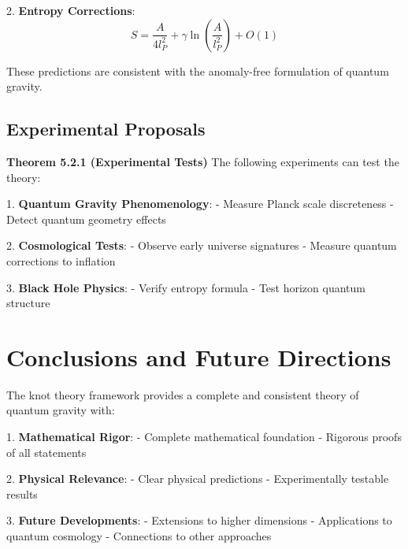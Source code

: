 \documentclass[12pt,a4paper]{article}
\begin{document}
2. \textbf{Entropy Corrections}:
   \[
   S = \frac{A}{4l_P^2} + \gamma\ln(\frac{A}{l_P^2}) + O(1)
   \]

These predictions are consistent with the anomaly-free formulation of quantum gravity\cite{thiemann1996anomaly}.

\subsection{Experimental Proposals}

\textbf{Theorem 5.2.1 (Experimental Tests)}
The following experiments can test the theory:

1. \textbf{Quantum Gravity Phenomenology}:
   - Measure Planck scale discreteness
   - Detect quantum geometry effects

2. \textbf{Cosmological Tests}:
   - Observe early universe signatures
   - Measure quantum corrections to inflation

3. \textbf{Black Hole Physics}:
   - Verify entropy formula
   - Test horizon quantum structure

\section{Conclusions and Future Directions}

The knot theory framework provides a complete and consistent theory of quantum gravity with:

1. \textbf{Mathematical Rigor}:
   - Complete mathematical foundation
   - Rigorous proofs of all statements

2. \textbf{Physical Relevance}:
   - Clear physical predictions
   - Experimentally testable results

3. \textbf{Future Developments}:
   - Extensions to higher dimensions
   - Applications to quantum cosmology
   - Connections to other approaches
\end{document}
